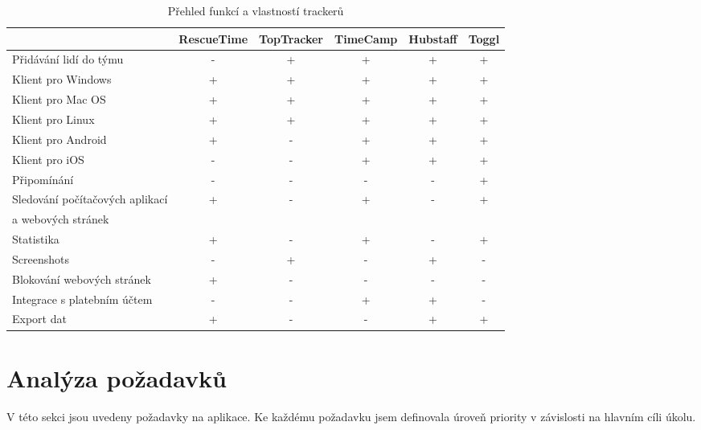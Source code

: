 \documentclass[thesis=B,czech]{FITthesis}[2012/06/26]
\begin{document}
\begin{table}
	\caption{Přehled funkcí a vlastností trackerů}\label{tab:compare}
	\begin{tabular}{|l|c|c|c|c|c|}
			\hline
		& RescueTime & TopTracker & TimeCamp & Hubstaff & Toggl \\ \hline
		Přidávání lidí do týmu & - & + & + &  + & + \\ \hline
		Klient pro Windows & + & + & + & + & + \\ \hline
		Klient pro Mac OS & + & + & + & + & + \\ \hline
		Klient pro Linux & + & + & + & + & + \\ \hline
		Klient pro Android & + & - & + & + & + \\ \hline
		Klient pro iOS & - & - & + & + & + \\ \hline
		Připomínání & - & - & - & - & + \\ \hline
		Sledování počítačových aplikací & + & - & + & - & +\\ a webových stránek & & & & & \\ \hline
		Statistika & + & - & + & - & + \\ \hline
		Screenshots & - & + & - & + & - \\ \hline
		Blokování webových stránek & + & - & - & - & - \\ \hline
		Integrace s platebním účtem & - & - & + & + & -\\ \hline
		Export dat & + & - & - & + & + \\ \hline
	\end{tabular}
\end{table}

\section{Analýza požadavků}
V této sekci jsou uvedeny požadavky na aplikace. Ke každému požadavku jsem definovala úroveň priority v závislosti na hlavním cíli úkolu.
\end{document}
